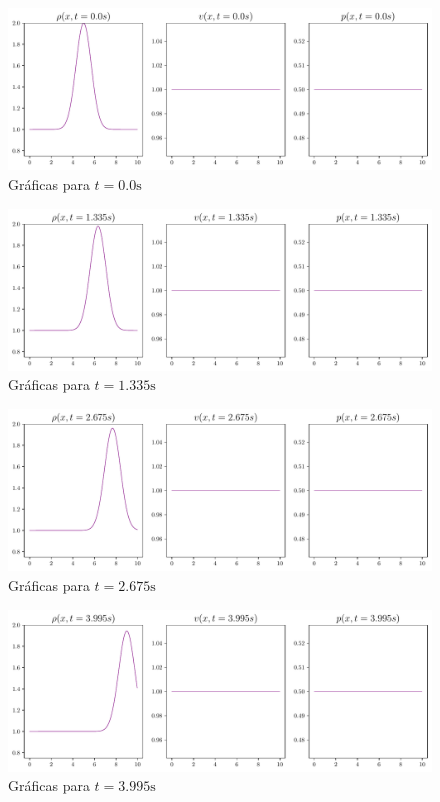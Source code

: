 \begin{figure}[ht]
	\centering
	\includegraphics[width=1.1\linewidth]{../euler1D/plots_en_TDG/set1/graficas/1.pdf}
	\caption{Gráficas para $t=0.0\unit{\s}$}
\end{figure}\vspace{\baselineskip}
\begin{figure}[ht]
	\includegraphics[width=1.1\linewidth]{../euler1D/plots_en_TDG/set1/graficas/135.pdf}
	\caption{Gráficas para $t=1.335\unit{\s}$}
\end{figure}\vspace{\baselineskip}
\begin{figure}[ht]
	\includegraphics[width=1.1\linewidth]{../euler1D/plots_en_TDG/set1/graficas/269.pdf}
	\caption{Gráficas para $t=2.675\unit{\s}$}
\end{figure}\vspace{\baselineskip}
\begin{figure}[ht]
	\includegraphics[width=1.1\linewidth]{../euler1D/plots_en_TDG/set1/graficas/401.pdf}
	\caption{Gráficas para $t=3.995\unit{\s}$}
\end{figure}
\clearpage
